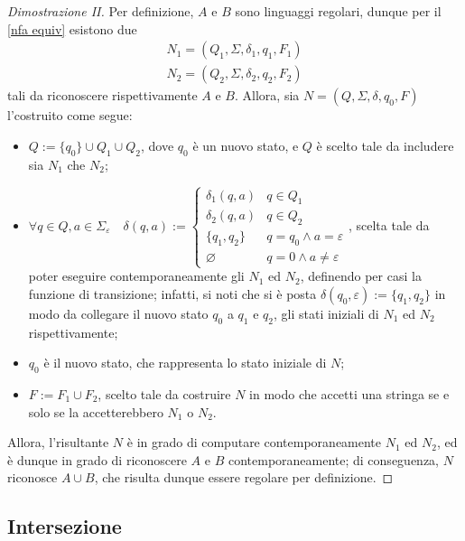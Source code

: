 \documentclass[a4paper, 12pt]{report}
\begin{document}
    \begin{proof}[Dimostrazione II]
        Per definizione, $A$ e $B$ sono linguaggi regolari, dunque per il \cref{nfa equiv} esistono due \NFA $$\left. \begin{array}{c}N_1 = (Q_1, \Sigma, \delta_1, q_1, F_1) \\ N_2 = (Q_2, \Sigma, \delta_2, q_2, F_2) \end{array} \right.$$ tali da riconoscere rispettivamente $A$ e $B$. Allora, sia $N = (Q, \Sigma, \delta, q_0, F)$ l'\NFA costruito come segue:

        \begin{itemize}
            \item $Q := \{q_0\} \cup Q_1 \cup Q_2$, dove $q_0$ è un nuovo stato, e $Q$ è scelto tale da includere sia $N_1$ che $N_2$;
            \item $\forall q \in Q, a \in \Sigma_{\varepsilon} \quad \delta(q, a) := \left \{ \begin{array}{ll} \delta_1(q, a) & q \in Q_1 \\ \delta_2(q, a) & q \in Q_2 \\ \{q_1, q_2\} & q = q_0 \land a = \varepsilon \\ \varnothing & q = 0 \land a \neq \varepsilon \end{array} \right.$, scelta tale da poter eseguire contemporaneamente gli \NFA $N_1$ ed $N_2$, definendo per casi la funzione di transizione; infatti, si noti che si è posta $\delta(q_0, \varepsilon) := \{q_1, q_2\}$ in modo da collegare il nuovo stato $q_0$ a $q_1$ e $q_2$, gli stati iniziali di $N_1$ ed $N_2$ rispettivamente;
            \item $q_0$ è il nuovo stato, che rappresenta lo stato iniziale di $N$;
            \item $F := F_1 \cup F_2$, scelto tale da costruire $N$ in modo che accetti una stringa se e solo se la accetterebbero $N_1$ o $N_2$.
        \end{itemize}


        Allora, l'\NFA risultante $N$ è in grado di computare contemporaneamente $N_1$ ed $N_2$, ed è dunque in grado di riconoscere $A$ e $B$ contemporaneamente; di conseguenza, $N$ riconosce $A \cup B$, che risulta dunque essere regolare per definizione.
    \end{proof}

    \subsection{Intersezione}
\end{document}
